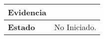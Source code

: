 \begin{longtable}{|p{4cm}|p{9.5cm}|}
\hline
\textbf{Evidencia}                                                                              &                                                                                                                                                                                                                                                                                                                       \\ 
\hline
\textbf{Estado}                                                                                 & No Iniciado.                                                                                                                                                                                                                                                                                                          \\
\hline
\end{longtable}
